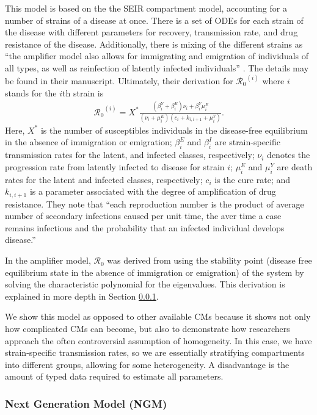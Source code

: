 \documentclass[12pt]{article}
\newcommand{\rr}{\ensuremath{\mathcal{R}_0}}
\begin{document}
This model is based on the the SEIR compartment model, accounting for a number of strains of a disease at once.  There is a set of ODEs for each strain of the disease with different parameters for recovery, transmission rate, and drug resistance of the disease.  Additionally, there is mixing of the different strains as ``the amplifier model also allows for immigrating and emigration of individuals of all types, as well as reinfection of latently infected individuals'' \citep{blower2004}.  The details may be found in their manuscript.  Ultimately, their derivation for $\rr^{(i)}$ where $i$ stands for the $i$th strain is
\begin{align*}
\rr^{(i)} = X^* \frac{ ( \beta_i^Y + \beta_i^E)\nu_i + \beta_i^Y \mu_i^E}{(\nu_i + \mu_i^E)(c_i + k_{i,i+1} + \mu_i^Y)}.
\end{align*}
Here, $X^*$ is the number of susceptibles individuals in the disease-free equilibrium in the absence of immigration or emigration; $\beta_i^E$ and $\beta_i^I$ are strain-specific transmission rates for the latent, and infected classes, respectively; $\nu_i$ denotes the progression rate from latently infected to disease for strain $i$; $\mu_i^E$ and $\mu_i^{Y}$ are death rates for the latent and infected classes, respectively; $c_i$ is the cure rate; and $k_{i, i+1}$ is a parameter associated with the degree of amplification of drug resistance.  They note that ``each reproduction number is the product of average number of secondary infections caused per unit time, the aver time a case remains infectious and the probability that an infected individual develops disease.''

In the amplifier model, $\rr$ was derived from using the stability point (disease free equilibrium state in the absence of immigration or emigration) of the system by solving the characteristic polynomial for the eigenvalues.  This derivation is explained in more depth in Section \ref{sec:ngm}.

We show this model as opposed to other available CMs because it shows not only how complicated CMs can become, but also to demonstrate how researchers approach the often controversial assumption of homogeneity.  In this case, we have strain-specific transmission rates, so we are essentially stratifying compartments into different groups, allowing for some heterogeneity.  A disadvantage is the amount of typed data required to estimate all parameters.


\subsubsection{Next Generation Model (NGM)}
\label{sec:ngm}
\end{document}
